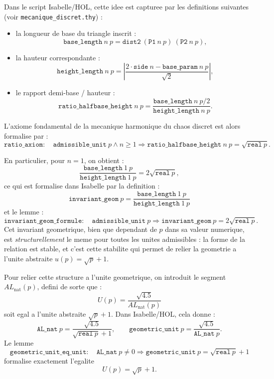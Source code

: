 \documentclass[12pt,a4paper]{article}
\theoremstyle{definition}
\theoremstyle{remark}
\begin{document}
Dans le script Isabelle/HOL, cette idee est capturee par les definitions
suivantes (voir \texttt{mecanique\_discret.thy}) :
\begin{itemize}
  \item la longueur de base du triangle inscrit :
  \[
    \texttt{base\_length}\ n\ p = \texttt{dist2}\ (\texttt{P1}\ n\ p)\ (\texttt{P2}\ n\ p),
  \]
  \item la hauteur correspondante :
  \[
    \texttt{height\_length}\ n\ p =
      \left|\frac{2 \cdot \texttt{side}\ n - \texttt{base\_param}\ n\ p}{\sqrt{2}}\right|,
  \]
  \item le rapport demi-base / hauteur :
  \[
    \texttt{ratio\_halfbase\_height}\ n\ p =
      \frac{\texttt{base\_length}\ n\ p / 2}{\texttt{height\_length}\ n\ p}.
  \]
\end{itemize}

L'axiome fondamental de la mecanique harmonique du chaos discret est alors
formalise par :
\[
  \texttt{ratio\_axiom} :
  \quad \texttt{admissible\_unit}\ p \wedge n \ge 1
  \Longrightarrow
  \texttt{ratio\_halfbase\_height}\ n\ p = \sqrt{\texttt{real}\ p}.
\]

En particulier, pour $n = 1$, on obtient :
\[
  \frac{\texttt{base\_length}\ 1\ p}{\texttt{height\_length}\ 1\ p}
  = 2 \sqrt{\texttt{real}\ p},
\]
ce qui est formalise dans Isabelle par la definition :
\[
  \texttt{invariant\_geom}\ p =
    \frac{\texttt{base\_length}\ 1\ p}{\texttt{height\_length}\ 1\ p}
\]
et le lemme :
\[
  \texttt{invariant\_geom\_formule} :
  \quad \texttt{admissible\_unit}\ p
  \Longrightarrow
  \texttt{invariant\_geom}\ p = 2 \sqrt{\texttt{real}\ p}.
\]
Cet invariant geometrique, bien que dependant de $p$ dans sa valeur numerique,
est \emph{structurellement} le meme pour toutes les unites admissibles : la
forme de la relation est stable, et c'est cette stabilite qui permet de
relier la geometrie a l'unite abstraite $u(p) = \sqrt{p} + 1$.

Pour relier cette structure a l'unite geometrique, on introduit le segment
$AL_{\text{nat}}(p)$, defini de sorte que :
\[
  U(p) = \frac{\sqrt{4.5}}{AL_{\text{nat}}(p)}
\]
soit egal a l'unite abstraite $\sqrt{p} + 1$. Dans Isabelle/HOL, cela donne :
\[
  \texttt{AL\_nat}\ p = \frac{\sqrt{4.5}}{\sqrt{\texttt{real}\ p} + 1},
  \qquad
  \texttt{geometric\_unit}\ p = \frac{\sqrt{4.5}}{\texttt{AL\_nat}\ p}.
\]
Le lemme
\[
  \texttt{geometric\_unit\_eq\_unit} :
  \quad \texttt{AL\_nat}\ p \neq 0
  \Longrightarrow
  \texttt{geometric\_unit}\ p = \sqrt{\texttt{real}\ p} + 1
\]
formalise exactement l'egalite
\[
  U(p) = \sqrt{p} + 1.
\]
\end{document}
